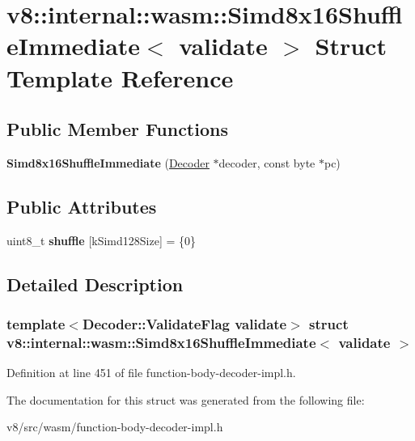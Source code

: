 \hypertarget{structv8_1_1internal_1_1wasm_1_1Simd8x16ShuffleImmediate}{}\section{v8\+:\+:internal\+:\+:wasm\+:\+:Simd8x16\+Shuffle\+Immediate$<$ validate $>$ Struct Template Reference}
\label{structv8_1_1internal_1_1wasm_1_1Simd8x16ShuffleImmediate}
\subsection*{Public Member Functions}
\begin{DoxyCompactItemize}
\item 
\mbox{\label{structv8_1_1internal_1_1wasm_1_1Simd8x16ShuffleImmediate_a6102ce7d3c17bab353587caba73b39c3}} 
{\bfseries Simd8x16\+Shuffle\+Immediate} (\mbox{\hyperlink{classv8_1_1internal_1_1wasm_1_1Decoder}{Decoder}} $\ast$decoder, const byte $\ast$pc)
\end{DoxyCompactItemize}
\subsection*{Public Attributes}
\begin{DoxyCompactItemize}
\item 
\mbox{\label{structv8_1_1internal_1_1wasm_1_1Simd8x16ShuffleImmediate_a00d13193822dcf82610bf968b11cee56}} 
uint8\+\_\+t {\bfseries shuffle} \mbox{[}k\+Simd128\+Size\mbox{]} = \{0\}
\end{DoxyCompactItemize}


\subsection{Detailed Description}
\subsubsection*{template$<$Decoder\+::\+Validate\+Flag validate$>$\newline
struct v8\+::internal\+::wasm\+::\+Simd8x16\+Shuffle\+Immediate$<$ validate $>$}



Definition at line 451 of file function-\/body-\/decoder-\/impl.\+h.



The documentation for this struct was generated from the following file\+:\begin{DoxyCompactItemize}
\item 
v8/src/wasm/function-\/body-\/decoder-\/impl.\+h\end{DoxyCompactItemize}
